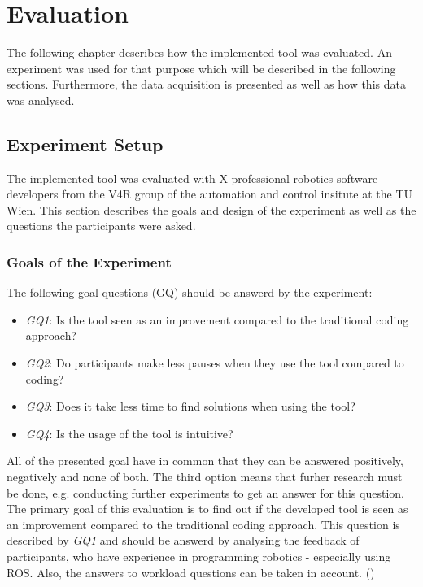\chapter{Evaluation}
The following chapter describes how the implemented tool was evaluated. An experiment was used for that purpose which will be described in the following sections. Furthermore, the data acquisition is presented as well as how this data was analysed.

\section{Experiment Setup} \label{sec:ExperimentSetup}
The implemented tool was evaluated with X professional robotics software developers from the V4R group of the automation and control insitute at the TU Wien. This section describes the goals and design of the experiment as well as the questions the participants were asked.

\subsection{Goals of the Experiment} \label{sub:ExperimentGoals}
The following goal questions (GQ) should be answerd by the experiment:
\begin{itemize}
    \item \textit{GQ1}: Is the tool seen as an improvement compared to the traditional coding approach?
    \item \textit{GQ2}: Do participants make less pauses when they use the tool compared to coding?
    \item \textit{GQ3}: Does it take less time to find solutions when using the tool?
    \item \textit{GQ4}: Is the usage of the tool is intuitive?
\end{itemize}
All of the presented goal have in common that they can be answered positively, negatively and none of both. The third option means that furher research must be done, e.g. conducting further experiments to get an answer for this question. \\

The primary goal of this evaluation is to find out if the developed tool is seen as an improvement compared to the traditional coding approach. This question is described by \textit{GQ1} and should be answerd by analysing the feedback of participants, who have experience in programming robotics - especially using ROS. Also, the answers to workload questions can be taken in account. () \\

